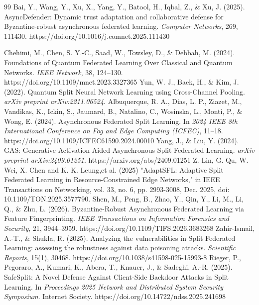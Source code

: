 \documentclass[pdflatex,sn-mathphys-num]{sn-jnl}
\begin{document}
\begin{thebibliography}{99}
Bai, Y., Wang, Y., Xu, X., Yang, Y., Batool, H., Iqbal, Z., \& Xu, J. (2025). AsyncDefender: Dynamic trust adaptation and collaborative defense for Byzantine-robust asynchronous federated learning. \textit{Computer Networks}, 269, 111430. https://doi.org/10.1016/j.comnet.2025.111430

Chehimi, M., Chen, S. Y.-C., Saad, W., Towsley, D., \& Debbah, M. (2024). Foundations of Quantum Federated Learning Over Classical and Quantum Networks. \textit{IEEE Network}, 38, 124--130. https://doi.org/10.1109/mnet.2023.3327365
Yun, W. J., Baek, H., \& Kim, J. (2022). Quantum Split Neural Network Learning using Cross-Channel Pooling. \textit{arXiv preprint arXiv:2211.06524}.
Albuquerque, R. A., Dias, L. P., Ziazet, M., Vandikas, K., Ickin, S., Jaumard, B., Natalino, C., Wosinska, L., Monti, P., \& Wong, E. (2024). Asynchronous Federated Split Learning. In \textit{2024 IEEE 8th International Conference on Fog and Edge Computing (ICFEC)}, 11--18. https://doi.org/10.1109/ICFEC61590.2024.00010
Yang, J., \& Liu, Y. (2024). GAS: Generative Activation-Aided Asynchronous Split Federated Learning. \textit{arXiv preprint arXiv:2409.01251}. https://arxiv.org/abs/2409.01251
Z. Lin, G. Qu, W. Wei, X. Chen and K. K. Leung,et al. (2025) "AdaptSFL: Adaptive Split Federated Learning in Resource-Constrained Edge Networks," in IEEE Transactions on Networking, vol. 33, no. 6, pp. 2993-3008, Dec. 2025, doi: 10.1109/TON.2025.3577790.
Shen, M., Peng, B., Zhao, Y., Qin, Y., Li, M., Li, Q., \& Zhu, L. (2026). Byzantine-Robust Asynchronous Federated Learning via Feature Fingerprinting. \textit{IEEE Transactions on Information Forensics and Security}, 21, 3944--3959. https://doi.org/10.1109/TIFS.2026.3683268
Zahir-Ismail, A.-T., \& Shukla, R. (2025). Analyzing the vulnerabilities in Split Federated Learning: assessing the robustness against data poisoning attacks. \textit{Scientific Reports}, 15(1), 30468. https://doi.org/10.1038/s41598-025-15993-8
Rieger, P., Pegoraro, A., Kumari, K., Abera, T., Knauer, J., \& Sadeghi, A.-R. (2025). SafeSplit: A Novel Defense Against Client-Side Backdoor Attacks in Split Learning. In \textit{Proceedings 2025 Network and Distributed System Security Symposium}. Internet Society. https://doi.org/10.14722/ndss.2025.241698

\end{thebibliography}
\end{document}
